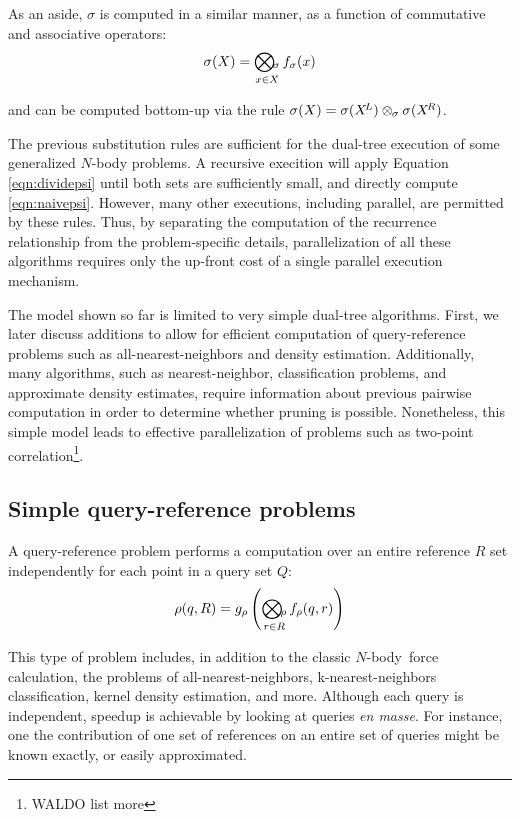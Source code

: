 \documentclass[times, 10pt,twocolumn]{article}
\newcommand{\nbody}{$N$-body}
\newcommand{\kdleft}{\hspace{-0.02in}^L}
\newcommand{\kdright}{\hspace{-0.02in}^R}
\newcommand{\myOp}[1]{\mathop{\bigotimes\nolimits\hspace{-0.045in}_{#1}}}
\newcommand{\myop}[1]{\otimes\hspace{-0.04in}_{#1}\hspace{0.03in}}
\newcommand{\allrho}{\rho}
\newcommand{\Oprho}{\myOp{\rho}}
\newcommand{\frho}{f_{\rho}}
\newcommand{\grho}{g_{\rho}}
\newcommand{\allsigma}{\sigma}
\newcommand{\Opsigma}{\myOp{\sigma}}
\newcommand{\opsigma}{\myop{\sigma}}
\newcommand{\fsigma}{f_{\sigma}}
\begin{document}
As an aside, $\allsigma$ is computed in a similar manner, as a function of commutative and associative operators:
\begin{equation}
\allsigma(X) = \Opsigma_{x \in X} \fsigma(x)
\label{eqn:defsigma}
\end{equation}

\noindent and can be computed bottom-up via the rule $\allsigma(X) = \allsigma(X\kdleft) \opsigma \allsigma(X\kdright)$.

\noindent The previous substitution rules are sufficient for the dual-tree execution of some generalized $N$-body problems.
A recursive execition will apply Equation \ref{eqn:dividepsi} until both sets are sufficiently small, and directly compute \ref{eqn:naivepsi}.
However, many other executions, including parallel, are permitted by these rules.
Thus, by separating the computation of the recurrence relationship from the problem-specific details, parallelization of all these algorithms requires only the up-front cost of a single parallel execution mechanism.

The model shown so far is limited to very simple dual-tree algorithms.
First, we later discuss additions to allow for efficient computation of query-reference problems such as all-nearest-neighbors and density estimation.
Additionally, many algorithms, such as nearest-neighbor, classification problems, and approximate density estimates, require information about previous pairwise computation in order to determine whether pruning is possible.
Nonetheless, this simple model leads to effective parallelization of problems such as two-point correlation\footnote{WALDO list more}.

\subsection{Simple query-reference problems}

A query-reference problem performs a computation over an entire reference $R$ set independently for each point in a query set $Q$:
\begin{equation}
\allrho(q, R) = \grho \left( \Oprho_{r \in R} \frho (q, r) \right)
\end{equation}

\noindent This type of problem includes, in addition to the classic \nbody\ force calculation, the problems of all-nearest-neighbors, k-nearest-neighbors classification, kernel density estimation, and more.
Although each query is independent, speedup is achievable by looking at queries {\it en masse}.
For instance, one the contribution of one set of references on an entire set of queries might be known exactly, or easily approximated.
\end{document}
